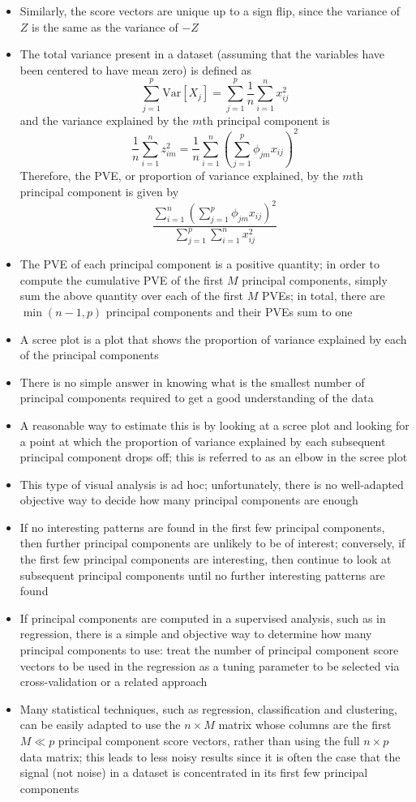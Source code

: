 \documentclass[12pt]{article}
\begin{document}
\begin{itemize}
\item Similarly, the score vectors are unique up to a sign flip, since the variance of $Z$ is the same as the variance of $-Z$ 
\item The total variance present in a dataset (assuming that the variables have been centered to have mean zero) is defined as $$ \sum_{j=1}^p \text{Var}[X_j] = \sum_{j=1}^p \frac{1}{n} \sum_{i=1}^n x_{ij}^2 $$ and the variance explained by the $m$th principal component is $$ \frac{1}{n}\sum_{i=1}^n z_{im}^2 = \frac{1}{n}\sum_{i=1}^n \left( \sum_{j=1}^p \phi_{jm}x_{ij}\right)^2 $$ Therefore, the PVE, or proportion of variance explained, by the $m$th principal component is given by 
$$ \frac{\sum_{i=1}^n \left( \sum_{j=1}^p \phi_{jm}x_{ij}\right)^2}{\sum_{j=1}^p \sum_{i=1}^n x_{ij}^2} $$ 
\item The PVE of each principal component is a positive quantity; in order to compute the cumulative PVE of the first $M$ principal components, simply sum the above quantity over each of the first $M$ PVEs; in total, there are $\min(n-1,p)$ principal components and their PVEs sum to one
\item A scree plot is a plot that shows the proportion of variance explained by each of the principal components 
\item There is no simple answer in knowing what is the smallest number of principal components required to get a good understanding of the data 
\item A reasonable way to estimate this is by looking at a scree plot and looking for a point at which the proportion of variance explained by each subsequent principal component drops off; this is referred to as an elbow in the scree plot 
\item This type of visual analysis is ad hoc; unfortunately, there is no well-adapted objective way to decide how many principal components are enough 
\item If no interesting patterns are found in the first few principal components, then further principal components are unlikely to be of interest; conversely, if the first few principal components are interesting, then continue to look at subsequent principal components until no further interesting patterns are found 
\item If principal components are computed in a supervised analysis, such as in regression, there is a simple and objective way to determine how many principal components to use: treat the number of principal component score vectors to be used in the regression as a tuning parameter to be selected via cross-validation or a related approach 
\item Many statistical techniques, such as regression, classification and clustering, can be easily adapted to use the $n \times M$ matrix whose columns are the first $M \ll p$ principal component score vectors, rather than using the full $n \times p$ data matrix; this leads to less noisy results since it is often the case that the signal (not noise) in a dataset is concentrated in its first few principal components 
\end{itemize}
\end{document}

